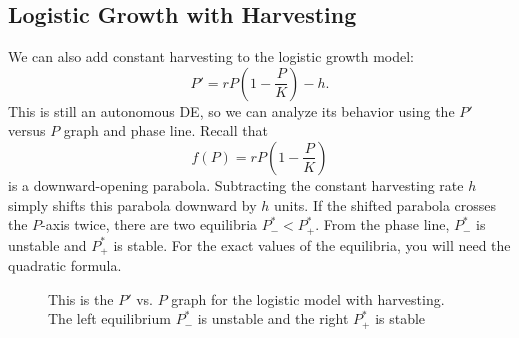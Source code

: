 \documentclass[09pt,letterpaper]{article}
\begin{document}

\subsection{Logistic Growth with Harvesting}
We can also add constant harvesting to the logistic growth model:
\[
P'=rP\left(1-\frac{P}{K}\right)-h.
\]
This is still an autonomous DE, so we can analyze its behavior using the
$P'$ versus $P$ graph and phase line. Recall that
\[
f(P)=rP\left(1-\frac{P}{K}\right)
\]
is a downward-opening parabola. Subtracting the constant harvesting rate $h$
simply shifts this parabola downward by $h$ units. If the shifted parabola crosses the $P$-axis twice, there are two equilibria $P^*_-<P^*_+$. From the phase line, $P^*_-$ is unstable and $P^*_+$ is stable. For the exact values of the equilibria, you will need the quadratic formula.

\begin{figure}[H]
    \centering
{}\caption{This is the $P'$ vs. $P$ graph for the logistic model with harvesting. The left equilibrium $P^*_-$ is unstable and the right $P^*_+$ is stable}
\end{figure}
\end{document}
